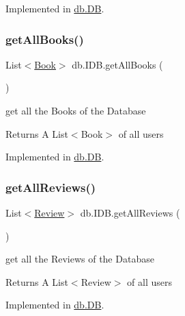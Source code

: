 Implemented in \hyperlink{classdb_1_1_d_b_ab3664756678e77a9f1b9c6c93c81d691}{db.\+DB}.

\mbox{\label{interfacedb_1_1_i_d_b_abd0d41674bbcdd524a3ca2403504bf25}} 
\subsubsection{\texorpdfstring{get\+All\+Books()}{getAllBooks()}}
{\footnotesize\ttfamily List$<$\hyperlink{classserver_1_1data_1_1_book}{Book}$>$ db.\+I\+D\+B.\+get\+All\+Books (\begin{DoxyParamCaption}{ }\end{DoxyParamCaption})}

get all the Books of the Database \begin{DoxyReturn}{Returns}
A List$<$\+Book$>$ of all users 
\end{DoxyReturn}


Implemented in \hyperlink{classdb_1_1_d_b_ab4fbfd3716967ce37cc462ca04c68ca8}{db.\+DB}.

\mbox{\label{interfacedb_1_1_i_d_b_a08f60c8b923599c650f04b4192d00d55}} 
\subsubsection{\texorpdfstring{get\+All\+Reviews()}{getAllReviews()}}
{\footnotesize\ttfamily List$<$\hyperlink{classserver_1_1data_1_1_review}{Review}$>$ db.\+I\+D\+B.\+get\+All\+Reviews (\begin{DoxyParamCaption}{ }\end{DoxyParamCaption})}

get all the Reviews of the Database \begin{DoxyReturn}{Returns}
A List$<$\+Review$>$ of all users 
\end{DoxyReturn}


Implemented in \hyperlink{classdb_1_1_d_b_ac7a84c5621f4ad2263cd830dbf10842e}{db.\+DB}.

\mbox{\label{interfacedb_1_1_i_d_b_a39ad15619eae3d0ec652e1849e3ebd50}} 
